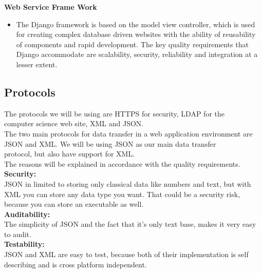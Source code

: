 \documentclass[12pt]{article}
\begin{document}
\indent\indent \linebreak\linebreak\textbf{Web Service Frame Work}
\begin{itemize}
\item The Django framework is based on the model view controller, which is used for creating complex database driven websites with the ability of reusability of components and rapid development. 
The key quality requirements that Django accommodate are scalability, security, reliability and integration at a lesser extent.

\end{itemize}	
	
	\subsection{Protocols}
	The protocols we will be using are HTTPS for security, LDAP for the \\ computer science web site, XML 		and JSON. \\
	\linebreak
	The two main protocols for data transfer in a web application environment are JSON and XML. We will be 	using JSON as our main data transfer \\ protocol, but also have support for XML. \\
	The reasons will be explained in accordance with the quality requirements.
	\\\linebreak
	 \textbf{Security:}
	\\\linebreak
	JSON in limited to storing only classical data like numbers and text, but with XML you can store any 		data type you want. That could be a security risk, because you can store an executable as well.
	\\\linebreak
	\textbf{Auditability:}
	\\\linebreak
	The simplicity of JSON and the fact that it’s only text base, makes it very easy to audit.
	\\\linebreak
	\textbf{Testability:}
	\\\linebreak
	JSON and XML are easy to test, because both of their implementation is self describing and is cross 		platform independent.
	\\\linebreak
\end{document}
